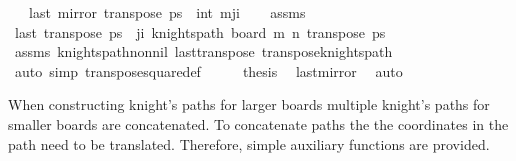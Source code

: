 \begin{isabellebody}
\ \ \ {\isachardoublequoteopen}last\ {\isacharparenleft}{\kern0pt}mirror{}\ {\isacharparenleft}{\kern0pt}transpose\ ps{\isacharparenright}{\kern0pt}{\isacharparenright}{\kern0pt}\ {\isacharequal}{\kern0pt}\ {\isacharparenleft}{\kern0pt}int\ m{\isacharplus}{\kern0pt}{}{\isacharminus}{\kern0pt}j{\isacharcomma}{\kern0pt}i{\isacharparenright}{\kern0pt}{\isachardoublequoteclose}\isanewline
%
\isadelimproof
\ \ %
\endisadelimproof
%
\isatagproof
{}\isamarkupfalse%
\ assms\isanewline
{}\isamarkupfalse%
\ {\isacharminus}{\kern0pt}\isanewline
\ \ \isamarkupfalse%
\ {\isachardoublequoteopen}last\ {\isacharparenleft}{\kern0pt}transpose\ ps{\isacharparenright}{\kern0pt}\ {\isacharequal}{\kern0pt}\ {\isacharparenleft}{\kern0pt}j{\isacharcomma}{\kern0pt}i{\isacharparenright}{\kern0pt}{\isachardoublequoteclose}\ {\isachardoublequoteopen}knights{\isacharunderscore}{\kern0pt}path\ {\isacharparenleft}{\kern0pt}board\ m\ n{\isacharparenright}{\kern0pt}\ {\isacharparenleft}{\kern0pt}transpose\ ps{\isacharparenright}{\kern0pt}{\isachardoublequoteclose}\isanewline
\ \ \ \ \isamarkupfalse%
\ assms\ knights{\isacharunderscore}{\kern0pt}path{\isacharunderscore}{\kern0pt}non{\isacharunderscore}{\kern0pt}nil\ last{\isacharunderscore}{\kern0pt}transpose\ transpose{\isacharunderscore}{\kern0pt}knights{\isacharunderscore}{\kern0pt}path\ \isanewline
\ \ \ \ \isamarkupfalse%
\ {\isacharparenleft}{\kern0pt}auto\ simp{\isacharcolon}{\kern0pt}\ transpose{\isacharunderscore}{\kern0pt}square{\isacharunderscore}{\kern0pt}def{\isacharparenright}{\kern0pt}\isanewline
\ \ \isamarkupfalse%
\ \isamarkupfalse%
\ {\isacharquery}{\kern0pt}thesis\ \isamarkupfalse%
\ last{\isacharunderscore}{\kern0pt}mirror{}\ \isamarkupfalse%
\ auto\isanewline
{}\isamarkupfalse%
%
\endisatagproof
{\isafoldproof}%
%
\isadelimproof
%
\endisadelimproof
%
\isadelimdocument
%
\endisadelimdocument
%
\isatagdocument
%
\isamarkuptrue%
%
\endisatagdocument
{\isafolddocument}%
%
\isadelimdocument
%
\endisadelimdocument
%
\begin{isamarkuptext}%
When constructing knight's paths for larger boards multiple knight's paths for smaller boards
are concatenated. To concatenate paths the the coordinates in the path need to be translated. 
Therefore, simple auxiliary functions are provided.%
\end{isamarkuptext}\isamarkuptrue%

\end{isabellebody}
